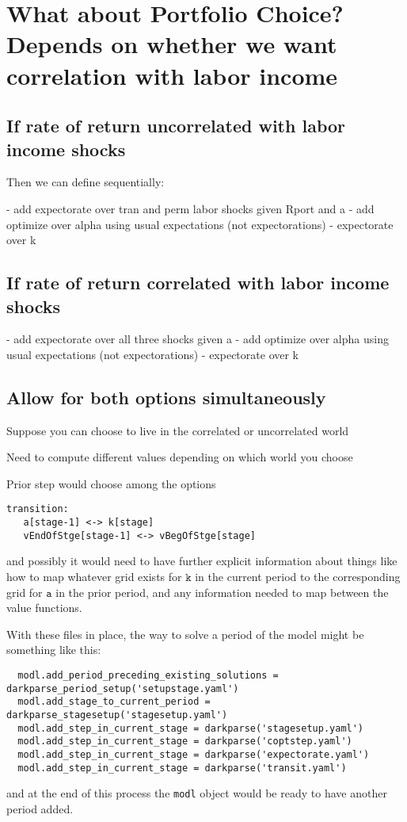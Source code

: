 \documentclass[SolvingMicroDSOPs]{subfiles}
\begin{document}
\section{What about Portfolio Choice?  Depends on whether we want correlation with labor income}

\subsection{If rate of return uncorrelated with labor income shocks}

Then we can define sequentially:

- add expectorate over tran and perm labor shocks given Rport and a
- add optimize over alpha using usual expectations (not expectorations)
- expectorate over k

\subsection{If rate of return correlated with labor income shocks}
- add expectorate over all three shocks given a
- add optimize over alpha using usual expectations (not expectorations)
- expectorate over k

\subsection{Allow for both options simultaneously}

Suppose you can choose to live in the correlated or uncorrelated world

Need to compute different values depending on which world you choose

Prior step would choose among the options


\begin{verbatim}
transition:
   a[stage-1] <-> k[stage]
   vEndOfStge[stage-1] <-> vBegOfStge[stage]
\end{verbatim}
and possibly it would need to have further explicit information about things like how to map whatever grid exists for $\texttt{k}$ in the current period to the corresponding grid for $\texttt{a}$ in the prior period, and any information needed to map between the value functions.


With these files in place, the way to solve a period of the model might be something like this:
\begin{verbatim}
  modl.add_period_preceding_existing_solutions = darkparse_period_setup('setupstage.yaml')
  modl.add_stage_to_current_period = darkparse_stagesetup('stagesetup.yaml')
  modl.add_step_in_current_stage = darkparse('stagesetup.yaml')
  modl.add_step_in_current_stage = darkparse('coptstep.yaml')
  modl.add_step_in_current_stage = darkparse('expectorate.yaml')
  modl.add_step_in_current_stage = darkparse('transit.yaml')
\end{verbatim}
and at the end of this process the \texttt{modl} object would be ready to have another period added.
\end{document}
